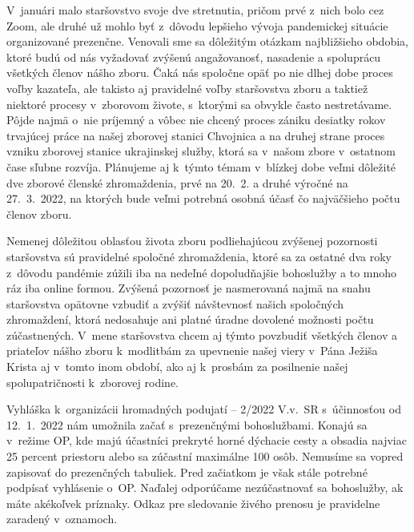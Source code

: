 V~januári malo staršovstvo svoje dve stretnutia, pričom prvé z~nich bolo cez Zoom, ale druhé už mohlo byť z~dôvodu lepšieho vývoja pandemickej situácie organizované prezenčne. Venovali sme sa dôležitým otázkam najbližšieho obdobia, ktoré budú od nás vyžadovať zvýšenú angažovanosť, nasadenie a spoluprácu všetkých členov nášho zboru. Čaká nás spoločne opäť po nie dlhej dobe proces voľby kazateľa, ale takisto aj pravidelné voľby staršovstva zboru a taktiež niektoré procesy v~zborovom živote, s~ktorými sa obvykle často nestretávame. Pôjde najmä o~nie príjemný a vôbec nie chcený proces zániku desiatky rokov trvajúcej práce na našej zborovej stanici Chvojnica a na druhej strane proces vzniku zborovej stanice ukrajinskej služby, ktorá sa v~našom zbore v~ostatnom čase sľubne rozvíja. Plánujeme aj k~týmto témam v~blízkej dobe veľmi dôležité dve zborové členské zhromaždenia, prvé na 20.~2. a druhé výročné na 27.~3.~2022, na ktorých bude veľmi potrebná osobná účasť čo najväčšieho počtu členov zboru.

Nemenej dôležitou oblasťou života zboru podliehajúcou zvýšenej pozornosti staršovstva sú pravidelné spoločné zhromaždenia, ktoré sa za ostatné dva roky z~dôvodu pandémie zúžili iba na nedeľné dopoludňajšie bohoslužby a to mnoho ráz iba online formou. Zvýšená pozornosť je nasmerovaná najmä na snahu staršovstva opätovne vzbudiť a zvýšiť návštevnosť našich spoločných zhromaždení, ktorá nedosahuje ani platné úradne dovolené možnosti počtu zúčastnených. V~mene staršovstva chcem aj týmto povzbudiť všetkých členov a priateľov nášho zboru k~modlitbám za upevnenie našej viery v~Pána Ježiša Krista aj v~tomto inom období, ako aj
k~prosbám za posilnenie našej spolupatričnosti k~zborovej rodine.





Vyhláška k~organizácii hromadných podujatí -- 2/2022 V.v.~SR s~účinnosťou od 12.~1.~2022 nám umožnila začať s~prezenčnými bohoslužbami. Konajú sa v~režime OP, kde majú účastníci prekryté horné dýchacie cesty a obsadia najviac 25 percent priestoru alebo sa zúčastní maximálne 100 osôb. Nemusíme sa vopred zapisovať do prezenčných tabuliek. Pred začiatkom je však stále potrebné podpísať vyhlásenie o~OP. Naďalej odporúčame nezúčastnovať sa bohoslužby, ak máte akékoľvek príznaky. Odkaz pre sledovanie živého prenosu je pravidelne zaradený v~oznamoch.



